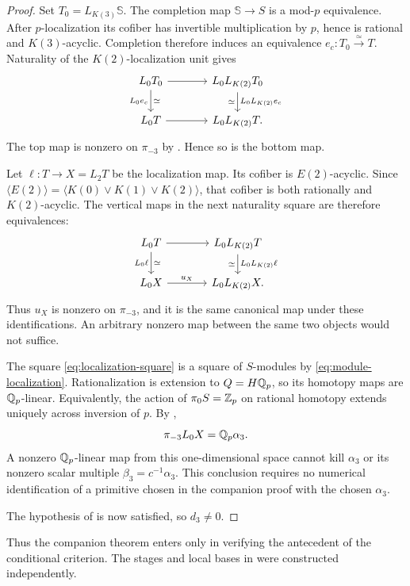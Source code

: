 \begin{proof}
Set \(T_0=L_{K(3)}\mathbb S\).  The completion map
\(\mathbb S\to S\) is a mod-\(p\) equivalence.
After \(p\)-localization its cofiber has invertible
multiplication by \(p\), hence is rational and \(K(3)\)-acyclic.
Completion therefore induces an equivalence
\(e_c:T_0\xrightarrow{\simeq}T\).
Naturality of the \(K(2)\)-localization unit gives
\begin{equation}\label{eq:completion-square}
\begin{tikzcd}[column sep=large]
 L_0T_0 \arrow[r] \arrow[d,"L_0e_c"',"\simeq"]
   & L_0L_{K(2)}T_0
       \arrow[d,"L_0L_{K(2)}e_c","\simeq"']\\
 L_0T \arrow[r] & L_0L_{K(2)}T.
\end{tikzcd}
\end{equation}
The top map is nonzero on \(\pi_{-3}\) by
\cite[Theorem~1.1]{CompanionHeightThreeObstruction}.  Hence so is the bottom map.

Let \(\ell:T\to X=L_2T\) be the localization map.
Its cofiber is \(E(2)\)-acyclic.  Since
\(\langle E(2)\rangle=\langle K(0)\vee K(1)\vee K(2)\rangle\),
that cofiber is both rationally and \(K(2)\)-acyclic.
The vertical maps in the next naturality square are therefore
equivalences:
\begin{equation}\label{eq:localization-square}
\begin{tikzcd}[column sep=large]
 L_0T \arrow[r] \arrow[d,"L_0\ell"',"\simeq"]
   & L_0L_{K(2)}T
       \arrow[d,"L_0L_{K(2)}\ell","\simeq"']\\
 L_0X \arrow[r,"u_X"] & L_0L_{K(2)}X.
\end{tikzcd}
\end{equation}
Thus \(u_X\) is nonzero on \(\pi_{-3}\), and it is the same
canonical map under these identifications.  An arbitrary nonzero
map between the same two objects would not suffice.

The square \eqref{eq:localization-square} is a square of
\(S\)-modules by \eqref{eq:module-localization}.
Rationalization is extension to \(Q=H\mathbb Q_p\), so its homotopy
maps are \(\mathbb Q_p\)-linear.  Equivalently, the action of
\(\pi_0S=\mathbb Z_p\) on rational homotopy extends uniquely across
inversion of \(p\).  By ,
\[
 \pi_{-3}L_0X=\mathbb Q_p\alpha_3.
\]
A nonzero \(\mathbb Q_p\)-linear map from this one-dimensional space
cannot kill \(\alpha_3\) or its nonzero scalar multiple
\(\beta_3=c^{-1}\alpha_3\).  This conclusion requires no
numerical identification of a primitive chosen in the companion
proof with the chosen \(\alpha_3\).

The hypothesis of  is now
satisfied, so \(d_3\ne0\).
\end{proof}

Thus the companion theorem enters only in verifying the antecedent of
the conditional criterion.  The stages and local bases in
 were constructed independently.

